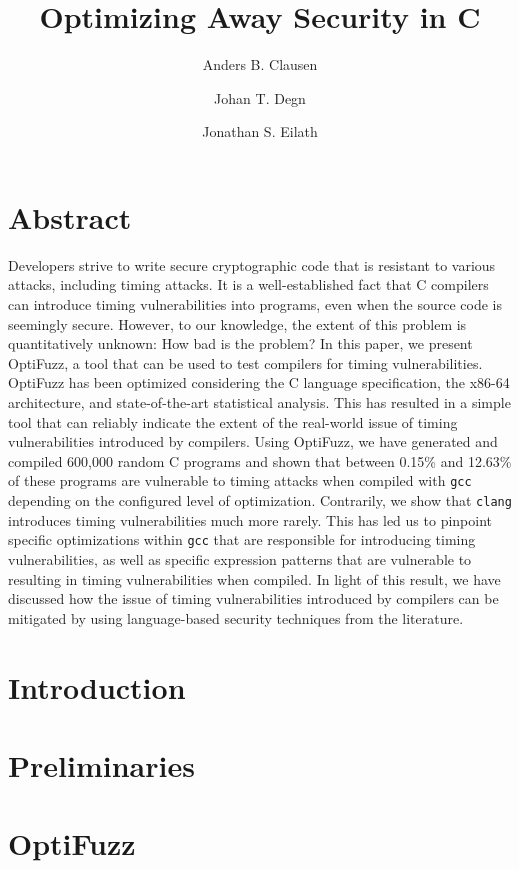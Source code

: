 \documentclass[10pt]{article}
\title{
  Optimizing Away Security in C
}
\author{Anders B. Clausen \and Johan T. Degn \and Jonathan S. Eilath}
\begin{document}
\maketitle
\thispagestyle{empty}

\section*{Abstract}
Developers strive to write secure cryptographic code that is resistant to various attacks, including timing attacks.
It is a well-established fact that C compilers can introduce timing vulnerabilities into programs, even when the source code is seemingly secure.
However, to our knowledge, the extent of this problem is quantitatively unknown: 
How bad is the problem?
In this paper, we present OptiFuzz, a tool that can be used to test compilers for timing vulnerabilities.
OptiFuzz has been optimized considering the C language specification, the x86-64 architecture, and state-of-the-art statistical analysis.
This has resulted in a simple tool that can reliably indicate the extent of the real-world issue of timing vulnerabilities introduced by compilers.
Using OptiFuzz, we have generated and compiled 600,000 random C programs and shown that between 0.15\% and 12.63\% of these programs are vulnerable to timing attacks when compiled with \texttt{gcc} depending on the configured level of optimization.
Contrarily, we show that \texttt{clang} introduces timing vulnerabilities much more rarely.
This has led us to pinpoint specific optimizations within \texttt{gcc} that are responsible for introducing timing vulnerabilities, as well as specific expression patterns that are vulnerable to resulting in timing vulnerabilities when compiled.
In light of this result, we have discussed how the issue of timing vulnerabilities introduced by compilers can be mitigated by using language-based security techniques from the literature.

\section{Introduction}


\section{Preliminaries}


\section{OptiFuzz}

\end{document}
